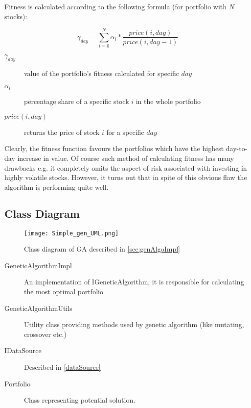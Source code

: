 Fitness is calculated according to the following formula (for portfolio with $N$ stocks):

\begin{equation}
    \gamma_{day} =  \sum_{i=0}^{N} {  \alpha_{i} * \frac{price(i,day)}{price(i,day - 1)} }
\end{equation}

\begin{description}
  \item [$\gamma_{day}$] 
      value of the portfolio's fitness calculated for specific $day$
  \item [$\alpha_{i}$]
      percentage share of a specific stock $i$ in the whole portfolio
  \item [$price(i,day)$]
      returns the price of stock $i$ for a specific $day$
\end{description}

Clearly, the fitness function favours the portfolios which have the highest day-to-day increase in value.
Of course such method of calculating fitness has many drawbacks e.g. it completely omits the aspect of risk associated with investing in highly volatile stocks.
However, it turns out that in spite of this obvious flaw the algorithm is performing quite well.  

\subsection{Class Diagram}

\begin{figure}[H]   
	    \begin{center}
	      \texttt{[image: Simple\_gen\_UML.png]}
	    \end{center}
	    \caption{Class diagram of GA described in \ref{sec:genAlgoImpl}} 
	  \end{figure}

\begin{description}
  \item [GeneticAlgorithmImpl]
    An implementation of IGeneticAlgorithm, it is responsible for calculating the most optimal portfolio
  \item [GeneticAlgorithmUtils]
    Utility class providing methods used by genetic algorithm (like mutating, crossover etc.)
  \item [IDataSource]
    Described in \ref{dataSource}
  \item [Portfolio]
    Class representing potential solution.

\end{description}

